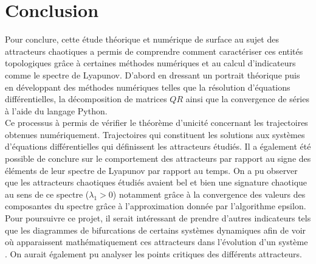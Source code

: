 \section{Conclusion} \label{sec: conclusion}
    Pour conclure, cette étude théorique et numérique de surface au sujet des
    attracteurs chaotiques a permis de comprendre comment caractériser ces
    entités topologiques grâce à certaines méthodes numériques et au calcul
    d'indicateurs comme le spectre de Lyapunov. D'abord en dressant un portrait
    théorique puis en développant des méthodes numériques telles que la
    résolution d'équations différentielles, la décomposition de matrices $QR$
    ainsi que la convergence de séries à l'aide du langage Python. \\

    Ce processus à permis de vérifier le théorème d'unicité concernant les
    trajectoires obtenues numériquement. Trajectoires qui constituent les
    solutions aux systèmes d'équations différentielles qui définissent les
    attracteurs étudiés. Il a également été possible de conclure sur le
    comportement des attracteurs par rapport au signe des éléments de leur
    spectre de Lyapunov par rapport au temps. On a pu observer que les
    attracteurs chaotiques étudiés avaient bel et bien une signature chaotique
    au sens de ce spectre ($\lambda_1 > 0$) notamment grâce à la convergence
    des valeurs des composantes du spectre grâce à l'approximation donnée par
    l'algorithme epsilon. \\

    Pour poursuivre ce projet, il serait intéressant de prendre d'autres
    indicateurs tels que les diagrammes de bifurcations de certains systèmes
    dynamiques afin de voir où apparaissent mathématiquement ces attracteurs
    dans l'évolution d'un système \cite{bifurcation}. On aurait également pu
    analyser les points critiques des différents attracteurs.
